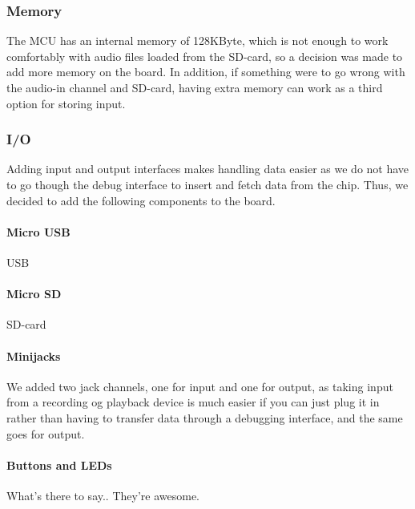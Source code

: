 \subsubsection{Memory} The MCU has an internal memory of 128KByte, which is not
enough to work comfortably with audio files loaded from the SD-card, so a
decision was made to add more memory on the board. In addition, if something
were to go wrong with the audio-in channel and SD-card, having extra memory can
work as a third option for storing input.

\subsubsection{I/O} Adding input and output interfaces makes handling data easier
as we do not have to go though the debug interface to insert and fetch data from
the chip. Thus, we decided to add the following components to the
board.

\paragraph{Micro USB} USB 

\paragraph{Micro SD} SD-card 

\paragraph{Minijacks} We added two jack channels, one for input and one for
output, as taking input from a recording og playback device is much easier if
you can just plug it in rather than having to transfer data through a debugging
interface, and the same goes for output.

\paragraph{Buttons and LEDs} What's there to say.. They're
awesome.
